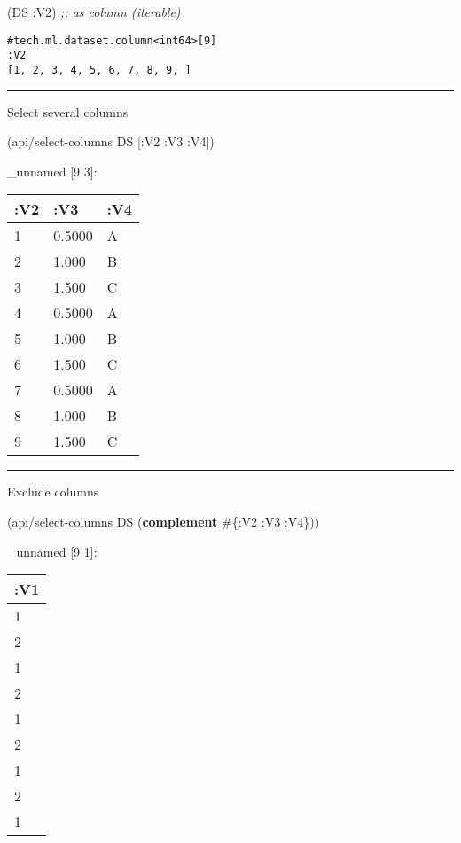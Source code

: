 \documentclass[]{article}
\newenvironment{Shaded}{\begin{snugshade}}{\end{snugshade}}
\newcommand{\KeywordTok}[1]{\textcolor[rgb]{0.13,0.29,0.53}{\textbf{#1}}}
\newcommand{\CommentTok}[1]{\textcolor[rgb]{0.56,0.35,0.01}{\textit{#1}}}
\newcommand{\AttributeTok}[1]{\textcolor[rgb]{0.77,0.63,0.00}{#1}}
\newcommand{\NormalTok}[1]{#1}
\begin{document}
\begin{Shaded}
\begin{Highlighting}[]
\NormalTok{(DS }\AttributeTok{:V2}\NormalTok{) }\CommentTok{;; as column (iterable)}
\end{Highlighting}
\end{Shaded}

\begin{verbatim}
#tech.ml.dataset.column<int64>[9]
:V2
[1, 2, 3, 4, 5, 6, 7, 8, 9, ]
\end{verbatim}

\begin{center}\rule{0.5\linewidth}{0.5pt}\end{center}

Select several columns

\begin{Shaded}
\begin{Highlighting}[]
\NormalTok{(api/select-columns DS [}\AttributeTok{:V2} \AttributeTok{:V3} \AttributeTok{:V4}\NormalTok{])}
\end{Highlighting}
\end{Shaded}

\_unnamed {[}9 3{]}:

\begin{longtable}[]{@{}lll@{}}
\toprule
:V2 & :V3 & :V4\tabularnewline
\midrule
\endhead
1 & 0.5000 & A\tabularnewline
2 & 1.000 & B\tabularnewline
3 & 1.500 & C\tabularnewline
4 & 0.5000 & A\tabularnewline
5 & 1.000 & B\tabularnewline
6 & 1.500 & C\tabularnewline
7 & 0.5000 & A\tabularnewline
8 & 1.000 & B\tabularnewline
9 & 1.500 & C\tabularnewline
\bottomrule
\end{longtable}

\begin{center}\rule{0.5\linewidth}{0.5pt}\end{center}

Exclude columns

\begin{Shaded}
\begin{Highlighting}[]
\NormalTok{(api/select-columns DS (}\KeywordTok{complement}\NormalTok{ #\{}\AttributeTok{:V2} \AttributeTok{:V3} \AttributeTok{:V4}\NormalTok{\}))}
\end{Highlighting}
\end{Shaded}

\_unnamed {[}9 1{]}:

\begin{longtable}[]{@{}l@{}}
\toprule
:V1\tabularnewline
\midrule
\endhead
1\tabularnewline
2\tabularnewline
1\tabularnewline
2\tabularnewline
1\tabularnewline
2\tabularnewline
1\tabularnewline
2\tabularnewline
1\tabularnewline
\bottomrule
\end{longtable}
\end{document}

